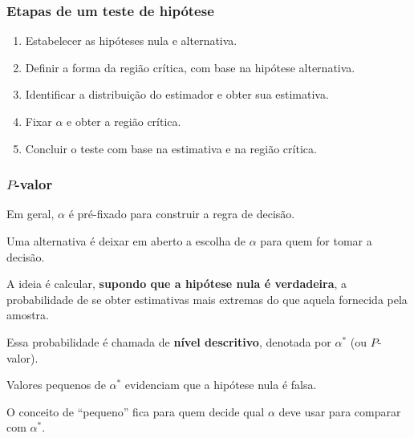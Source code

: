 \documentclass{beamer}
\begin{document}
\begin{frame}
\frametitle{Etapas de um teste de hipótese}

\begin{enumerate}
\def\labelenumi{\arabic{enumi}.}
\item
  Estabelecer as hipóteses nula e alternativa.
\item
  Definir a forma da região crítica, com base na hipótese alternativa.
\item
  Identificar a distribuição do estimador e obter sua estimativa.
\item
  Fixar \(\alpha\) e obter a região crítica.
\item
  Concluir o teste com base na estimativa e na região crítica.
\end{enumerate}
\end{frame}

\begin{frame}
\frametitle{\(P\)-valor}

Em geral, \(\alpha\) é pré-fixado para construir a regra de decisão.

Uma alternativa é deixar em aberto a escolha de \(\alpha\) para quem for
tomar a decisão.

A ideia é calcular, \textbf{supondo que a hipótese nula é verdadeira}, a
probabilidade de se obter estimativas mais extremas do que aquela
fornecida pela amostra.

Essa probabilidade é chamada de \textbf{nível descritivo}, denotada por
\(\alpha^*\) (ou \(P\)-valor).

Valores pequenos de \(\alpha^*\) evidenciam que a hipótese nula é falsa.

O conceito de ``pequeno'' fica para quem decide qual \(\alpha\) deve
usar para comparar com \(\alpha^*\).
\end{frame}
\end{document}
